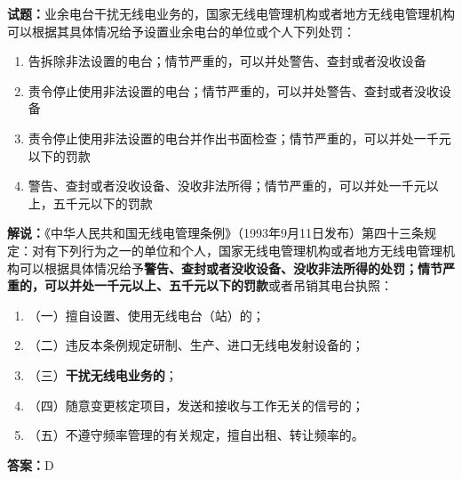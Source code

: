 \documentclass{ctexbook}
\begin{document}
\noindent\textbf{试题：}业余电台干扰无线电业务的，国家无线电管理机构或者地方无线电管理机构可以根据其具体情况给予设置业余电台的单位或个人下列处罚：
\begin{enumerate}[leftmargin=3em]
  \item  告拆除非法设置的电台；情节严重的，可以并处警告、查封或者没收设备
  \item  责令停止使用非法设置的电台；情节严重的，可以并处警告、查封或者没收设备
  \item  责令停止使用非法设置的电台并作出书面检查；情节严重的，可以并处一千元以下的罚款
  \item  警告、查封或者没收设备、没收非法所得；情节严重的，可以并处一千元以上，五千元以下的罚款
\end{enumerate}
\noindent\textbf{解说：}《中华人民共和国无线电管理条例》（1993年9月11日发布）第四十三条规定：对有下列行为之一的单位和个人，国家无线电管理机构或者地方无线电管理机构可以根据具体情况给予\textbf{警告、查封或者没收设备、没收非法所得的处罚；情节严重的，可以并处一千元以上、五千元以下的罚款}或者吊销其电台执照：
\begin{enumerate}[leftmargin=3em, label=]
  \item（一）擅自设置、使用无线电台（站）的；
  \item（二）违反本条例规定研制、生产、进口无线电发射设备的；
  \item（三）\textbf{干扰无线电业务的}；
  \item（四）随意变更核定项目，发送和接收与工作无关的信号的；
  \item（五）不遵守频率管理的有关规定，擅自出租、转让频率的。
\end{enumerate}
\textbf{答案：}D

\vspace{\baselineskip}
\end{document}
